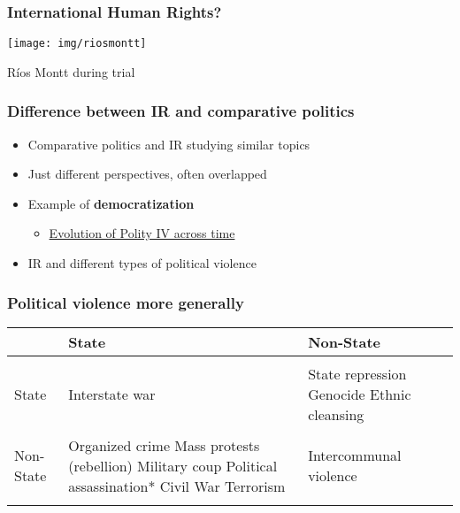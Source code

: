 \documentclass[aspectratio=43,handout]{beamer}
\begin{document}
\begin{frame}
\frametitle{International Human Rights?}
\centering

\texttt{[image: img/riosmontt]}

{\small Ríos Montt during trial}

\end{frame}

\begin{frame}
\frametitle{Difference between IR and comparative politics}
\centering

\begin{itemize}
  \item Comparative politics and IR studying similar topics
  \item Just different perspectives, often overlapped
  \item Example of \textbf{democratization}
  \begin{itemize}
    \item \href{https://dartthrowingchimp.files.wordpress.com/2012/09/politymovie3.gif}{Evolution of Polity IV across time}
  \end{itemize}
  \item IR and different types of political violence
\end{itemize}

\end{frame}

\begin{frame}
\frametitle{Political violence more generally}
\centering

\begin{tabular}{m{1.75cm}|m{4cm}m{4cm}}
& {\color{gray}{\footnotesize Target:}} \newline State & {\color{gray}{\footnotesize Target:}} \newline Non-State \\\hline\\
{\color{gray}{\footnotesize Perpetrator:}} \newline State & Interstate war & State repression \newline Genocide \newline Ethnic cleansing \\\\
{\color{gray}{\footnotesize Perpetrator:}} \newline Non-State & Organized crime \newline Mass protests (rebellion) \newline Military coup \newline Political assassination* \newline Civil War \newline Terrorism & Intercommunal violence\\\\\hline
\end{tabular}

\end{frame}
\end{document}
